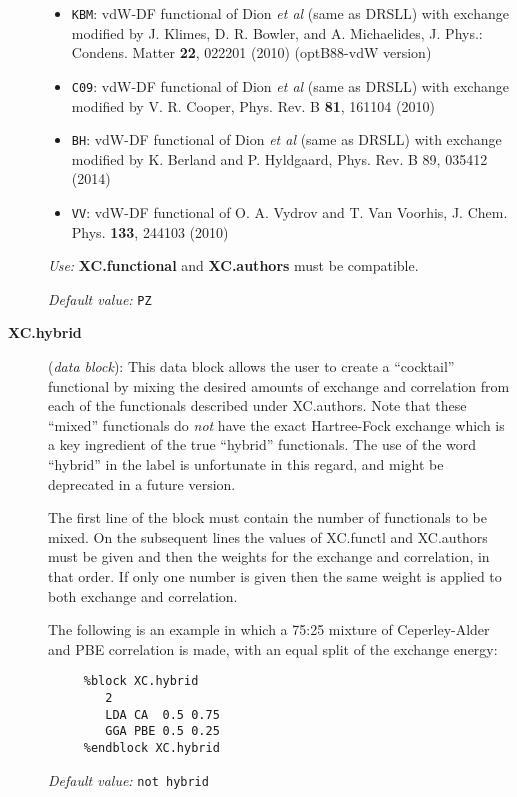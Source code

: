 \begin{description}
\begin{itemize}
\item \texttt{KBM}:
vdW-DF functional of Dion \textit{et al} (same as DRSLL)
with exchange modified by J. Klimes, D. R. Bowler, and A. Michaelides, 
J. Phys.: Condens. Matter \textbf{22}, 022201 (2010) (optB88-vdW version)
\item \texttt{C09}:
vdW-DF functional of Dion \textit{et al} (same as DRSLL)
with exchange modified by V. R. Cooper, Phys. Rev. B \textbf{81}, 161104 (2010)
\item \texttt{BH}:
vdW-DF functional of Dion \textit{et al} (same as DRSLL) 
with exchange modified by 
K. Berland and P. Hyldgaard, Phys. Rev. B 89, 035412 (2014)
\item \texttt{VV}: 
vdW-DF functional of O. A. Vydrov and T. Van Voorhis, 
J. Chem. Phys. \textbf{133}, 244103 (2010)

\end{itemize}

\textit{Use:} \textbf{XC.functional} and \textbf{XC.authors} must be compatible.

\textit{Default value:} \texttt{PZ}

\item[\textbf{XC.hybrid}] (\textit{data block}):
This data block allows the user to create a ``cocktail'' functional by
mixing the desired amounts of exchange and correlation from each of
the functionals described under XC.authors. Note that these ``mixed''
functionals do {\em not} have the exact Hartree-Fock exchange which
is a key ingredient of the true ``hybrid'' functionals. The use of
the word ``hybrid'' in the label is unfortunate in this regard, and
might be deprecated in a future version.

The first line of the block must contain the number of functionals to
be mixed. On the subsequent lines the values of XC.functl and
XC.authors must be given and then the weights for the exchange and
correlation, in that order. If only one number is given then the same
weight is applied to both exchange and correlation.

The following is an example in which a 75:25 mixture of Ceperley-Alder
and PBE correlation is made, with an equal split of the exchange
energy:

\begin{verbatim}
     %block XC.hybrid
        2
        LDA CA  0.5 0.75
        GGA PBE 0.5 0.25
     %endblock XC.hybrid
\end{verbatim}

\textit{Default value:} \texttt{not hybrid}


\end{description}


